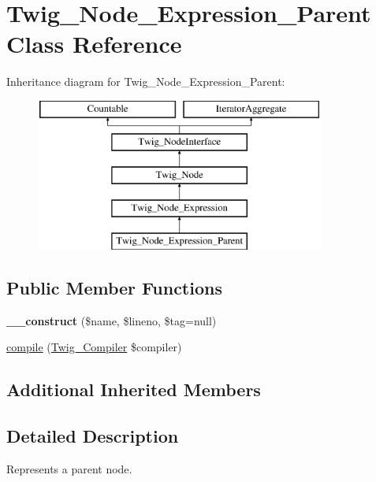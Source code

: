 \hypertarget{class_twig___node___expression___parent}{}\section{Twig\+\_\+\+Node\+\_\+\+Expression\+\_\+\+Parent Class Reference}
\label{class_twig___node___expression___parent}
Inheritance diagram for Twig\+\_\+\+Node\+\_\+\+Expression\+\_\+\+Parent\+:\begin{figure}[H]
\begin{center}
\leavevmode
\includegraphics[height=5.000000cm]{class_twig___node___expression___parent}
\end{center}
\end{figure}
\subsection*{Public Member Functions}
\begin{DoxyCompactItemize}
\item 
\hypertarget{class_twig___node___expression___parent_a0028166bd229cdc2e0c0a79c4f3069fa}{}{\bfseries \+\_\+\+\_\+construct} (\$name, \$lineno, \$tag=null)\label{class_twig___node___expression___parent_a0028166bd229cdc2e0c0a79c4f3069fa}

\item 
\hyperlink{class_twig___node___expression___parent_a4e0faa87c3fae583620b84d3607085da}{compile} (\hyperlink{class_twig___compiler}{Twig\+\_\+\+Compiler} \$compiler)
\end{DoxyCompactItemize}
\subsection*{Additional Inherited Members}


\subsection{Detailed Description}
Represents a parent node.

